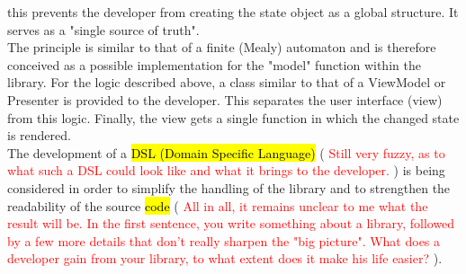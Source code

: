 this prevents the developer from creating the state object as a global structure. It serves as a "single source of truth".
\\
The principle is similar to that of a finite (Mealy) automaton and is therefore conceived as a possible implementation for the "model" function within the library. 
For the logic described above, a class similar to that of a ViewModel or Presenter is provided to the developer. This separates the user interface (view) from this logic.
Finally, the view gets a single function in which the changed state is rendered.
\\
The development of a 
\hl{DSL (Domain Specific Language)} (
    \textcolor{red}{Still very fuzzy, as to what such a DSL could look like and what it brings to the developer.}
) is being considered in order to simplify the handling of the library and to strengthen the readability 
of the source \hl{code} (
    \textcolor{red}{All in all, it remains unclear to me what the result will be. In the first sentence, you write something about a library, followed by a few more details that don't really sharpen the "big picture". What does a developer gain from your library, to what extent does it make his life easier?}
).


